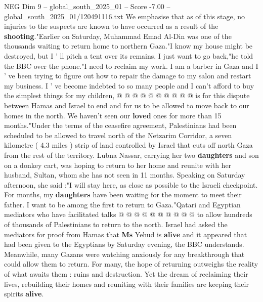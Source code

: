 \begin{textsample}{NEG Dim 9 – global\_south\_2025\_01 – Score -7.00 – global\_south\_2025\_01/120491116.txt}
We emphasise that as of this stage, no injuries to the suspects are known to have occurred as a result of the \textbf{shooting}."Earlier on Saturday, Muhammad Emad Al-Din was one of the thousands waiting to return home to northern Gaza."I know my house might be destroyed, but I ' ll pitch a tent over its remains.
I just want to go back,"he told the BBC over the phone."I need to reclaim my work.
I am a barber in Gaza and I ' ve been trying to figure out how to repair the damage to my salon and restart my business.
I ' ve become indebted to so many people and I can't afford to buy the simplest things for my children, @ @ @ @ @ @ @ @ @ @ is for this dispute between Hamas and Israel to end and for us to be allowed to move back to our homes in the north.
We haven't seen our \textbf{loved} ones for more than 15 months."Under the terms of the ceasefire agreement, Palestinians had been scheduled to be allowed to travel north of the Netzarim Corridor, a seven kilometre ( 4.3 miles ) strip of land controlled by Israel that cuts off north Gaza from the rest of the territory.
Lubna Nassar, carrying her two \textbf{daughters} and son on a donkey cart, was hoping to return to her home and reunite with her husband, Sultan, whom she has not seen in 11 months.
Speaking on Saturday afternoon, she said :"I will stay here, as close as possible to the Israeli checkpoint.
For months, my \textbf{daughters} have been waiting for the moment to meet their father.
I want to be among the first to return to Gaza."Qatari and Egyptian mediators who have facilitated talks @ @ @ @ @ @ @ @ @ @ to allow hundreds of thousands of Palestinians to return to the north.
Israel had asked the mediators for proof from Hamas that \textbf{Ms} Yehud is \textbf{alive} and it appeared that had been given to the Egyptians by Saturday evening, the BBC understands.
Meanwhile, many Gazans were watching anxiously for any breakthrough that could allow them to return.
For many, the hope of returning outweighs the reality of what awaits them : ruins and destruction.
Yet the dream of reclaiming their lives, rebuilding their homes and reuniting with their families are keeping their spirits \textbf{alive}.

\end{textsample}
